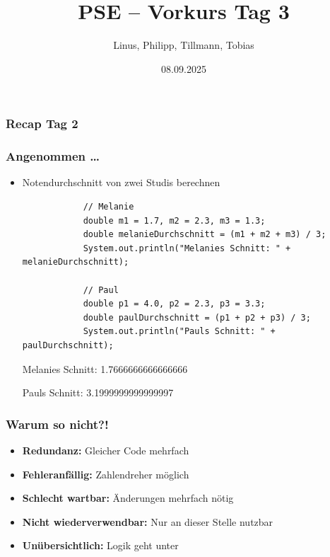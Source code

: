 \documentclass{../../presentation}
\title{PSE – Vorkurs Tag 3}
\author{Linus, Philipp, Tillmann, Tobias}
\institute{FIUS - Fachgruppe Informatik Universität Stuttgart}
\date{08.09.2025}
\begin{document}
\begin{frame}
	\titlepage
\end{frame}

\begin{frame}
	\listoftodos
\end{frame}

\begin{frame}
	\frametitle{Recap Tag 2}
\end{frame}

\begin{frame}[fragile]
	\frametitle{Angenommen \dots}
	\begin{itemize}
		\item\pause Notendurchschnitt von zwei Studis berechnen
		      \begin{verbatim}
            // Melanie
            double m1 = 1.7, m2 = 2.3, m3 = 1.3;
            double melanieDurchschnitt = (m1 + m2 + m3) / 3;
            System.out.println("Melanies Schnitt: " + melanieDurchschnitt);

            // Paul
            double p1 = 4.0, p2 = 2.3, p3 = 3.3;
            double paulDurchschnitt = (p1 + p2 + p3) / 3;
            System.out.println("Pauls Schnitt: " + paulDurchschnitt);
        \end{verbatim}
		      \begin{ausgabe}
			      Melanies Schnitt: 1.7666666666666666

			      Pauls Schnitt: 3.1999999999999997
		      \end{ausgabe}
	\end{itemize}
\end{frame}

\begin{frame}[fragile]
	\frametitle{Warum so nicht?!}
	\begin{itemize}
		\item\pause \textbf{Redundanz:} Gleicher Code mehrfach
		\item\pause \textbf{Fehleranfällig:} Zahlendreher möglich
		\item\pause \textbf{Schlecht wartbar:} Änderungen mehrfach nötig
		\item\pause \textbf{Nicht wiederverwendbar:} Nur an dieser Stelle nutzbar 
		\item\pause \textbf{Unübersichtlich:} Logik geht unter
	\end{itemize}
	\vspace{2em}
	\begin{minipage}{\textwidth}
		\centering
		\onslide\pause{\Huge $\rightarrow$~}%
	\end{minipage}
\end{frame}
\end{document}
